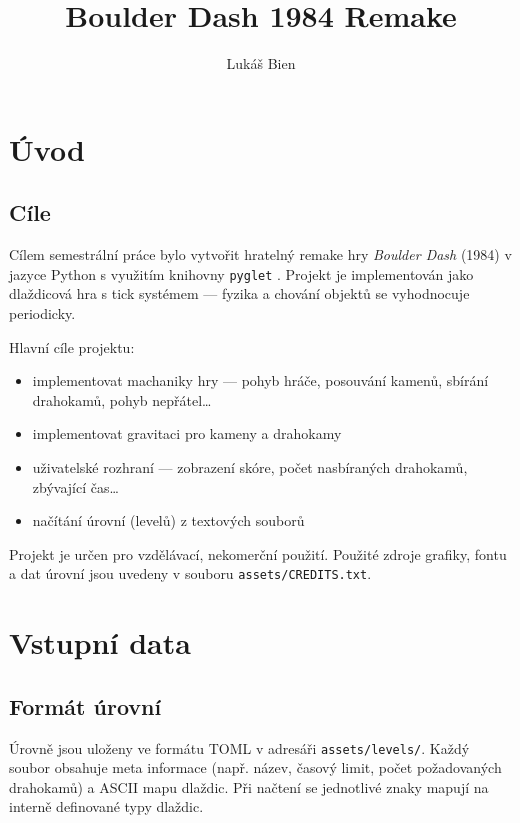 \documentclass[czech]{pyt-report}
\title{Boulder Dash 1984 Remake}
\author{Lukáš Bien}
\affiliation{ČVUT--FIT}
\def\file#1{{\tt#1}}
\begin{document}
\maketitle

\section{Úvod}

\subsection{Cíle}
Cílem semestrální práce bylo vytvořit hratelný remake hry \emph{Boulder Dash} (1984) v jazyce Python s využitím knihovny \texttt{pyglet} \cite{pyglet}.
Projekt je implementován jako dlaždicová hra s tick systémem --- fyzika a chování objektů se vyhodnocuje periodicky.

Hlavní cíle projektu:
\begin{itemize}
  \item implementovat machaniky hry --- pohyb hráče, posouvání kamenů, sbírání drahokamů, pohyb nepřátel\ldots
  \item implementovat gravitaci pro kameny a drahokamy
  \item uživatelské rozhraní --- zobrazení skóre, počet nasbíraných drahokamů, zbývající čas\ldots
  \item načítání úrovní (levelů) z textových souborů
\end{itemize}

Projekt je určen pro vzdělávací, nekomerční použití. Použité zdroje grafiky, fontu a dat úrovní jsou uvedeny v souboru \file{assets/CREDITS.txt}.

\section{Vstupní data}

\subsection{Formát úrovní}
Úrovně jsou uloženy ve formátu TOML v adresáři \file{assets/levels/}. Každý soubor obsahuje meta informace (např. název, časový limit, počet požadovaných drahokamů) a ASCII mapu dlaždic. Při načtení se jednotlivé znaky mapují na interně definované typy dlaždic.
\end{document}
